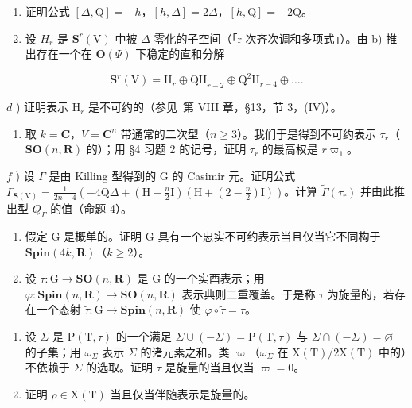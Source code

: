 \begin{enumerate}
\begin{enumerate}
\def\labelenumi{\alph{enumi})}
\setcounter{enumi}{1}
\item
  证明公式 \([\Delta, \mathrm{Q}] = -h\)，\([h, \Delta] = 2\Delta\)，\([h, \mathrm{Q}] = -2\mathrm{Q}\)。
\item
  设 \(H_{r}\) 是 \(\mathbf{S}^{r}(\mathrm{V})\) 中被 \(\Delta\) 零化的子空间（「r 次齐次调和多项式」）。由 b) 推出存在一个在 \(\mathbf{O}(\varPsi)\) 下稳定的直和分解
\end{enumerate}

\[
\mathbf {S} ^ {r} (\mathrm{V}) = \mathrm{H} _ {r} \oplus \mathrm{QH} _ {r - 2} \oplus \mathrm{Q} ^ {2} \mathrm{H} _ {r - 4} \oplus \dots .
\]

\(d\) ) 证明表示 \(\mathrm{H}_r\) 是不可约的（参见~第 VIII 章，§13，节 3，(IV)）。

\begin{enumerate}
\def\labelenumi{\alph{enumi})}
\setcounter{enumi}{4}
\tightlist
\item
  取 \(k = \mathbf{C}\)，\(V = \mathbf{C}^n\) 带通常的二次型（\(n \geq 3\)）。我们于是得到不可约表示 \(\tau_r\)（\(\mathbf{SO}(n, \mathbf{R})\) 的）；用 §4 习题 2 的记号，证明 \(\tau_r\) 的最高权是 \(r\varpi_1\)。
\end{enumerate}

\(f\) ) 设 \(\Gamma\) 是由 Killing 型得到的 G 的 Casimir 元。证明公式 \(\Gamma_{\mathbf{S}(\mathrm{V})} = \frac{1}{2n - 4}\left(-4\mathrm{Q}\Delta +\left(\mathrm{H} + \frac{n}{2}\mathrm{I}\right)\left(\mathrm{H} + \left(2 - \frac{n}{2}\right)\mathrm{I}\right)\right)\)。计算 \(\tilde{\Gamma} (\tau_r)\) 并由此推出型 \(Q_{\Gamma}\) 的值（命题 4）。

\begin{enumerate}
\def\labelenumi{\arabic{enumi})}
\setcounter{enumi}{5}
\item
  假定 G 是概单的。证明 G 具有一个忠实不可约表示当且仅当它不同构于 \(\mathbf{Spin}(4k, \mathbf{R})\)（\(k \geq 2\)）。
\item
  设 \(\tau : \mathrm{G} \to \mathbf{SO}(n, \mathbf{R})\) 是 \(\mathrm{G}\) 的一个实酉表示；用 \(\varphi : \mathbf{Spin}(n, \mathbf{R}) \to \mathbf{SO}(n, \mathbf{R})\) 表示典则二重覆盖。于是称 \(\tau\) 为旋量的，若存在一个态射 \(\tilde{\tau} : \mathrm{G} \to \mathbf{Spin}(n, \mathbf{R})\) 使 \(\varphi \circ \tilde{\tau} = \tau\)。
\end{enumerate}

\begin{enumerate}
\def\labelenumi{\alph{enumi})}
\item
  设 \(\Sigma\) 是 \(\mathrm{P}(\mathrm{T},\tau)\) 的一个满足 \(\Sigma\cup(-\Sigma)=\mathrm{P}(\mathrm{T},\tau)\) 与 \(\Sigma\cap(-\Sigma)=\varnothing\) 的子集；用 \(\omega_{\Sigma}\) 表示 \(\Sigma\) 的诸元素之和。类 \(\varpi\)（\(\omega_{\Sigma}\) 在 \(\mathrm{X}(\mathrm{T})/2\mathrm{X}(\mathrm{T})\) 中的）不依赖于 \(\Sigma\) 的选取。证明 \(\tau\) 是旋量的当且仅当 \(\varpi=0\)。
\item
  证明 \(\rho \in \mathrm{X}(\mathrm{T})\) 当且仅当伴随表示是旋量的。
\end{enumerate}


\end{enumerate}
